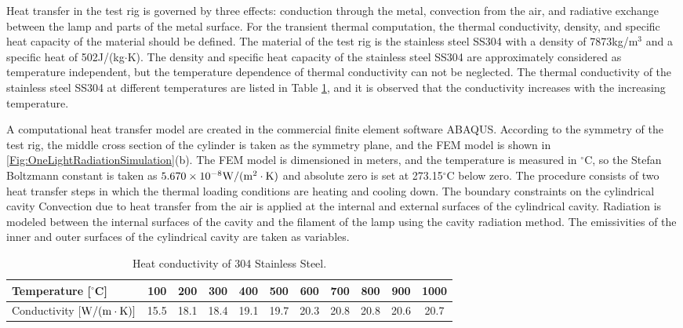 Heat transfer in the test rig is governed by three effects: conduction through the metal, convection from the air, and radiative exchange between the lamp and parts of the metal surface. 
For the transient thermal computation, the thermal conductivity, density, and specific heat capacity of the material should be defined.
The material of the test rig is the stainless steel SS304 with a density of 7873kg/m$^3$ and a specific heat of 502J/(kg$\cdot$K). The density and specific heat capacity of the stainless steel SS304 are approximately considered as temperature independent, but the temperature dependence of thermal conductivity can not be neglected. The thermal conductivity of the stainless steel SS304 at different temperatures are listed in Table \ref{Tab:SS304HeatTransfer}, and it is observed that the conductivity increases with the increasing temperature. 

A computational heat transfer model are created in the commercial finite element software ABAQUS.
According to the symmetry of the test rig, the middle cross section of the cylinder is taken as the symmetry plane, and the FEM model is shown in \ref{Fig:OneLightRadiationSimulation}(b).
The FEM model is dimensioned in meters, and the temperature is measured in $^\circ$C, so the Stefan Boltzmann constant is taken as $5.670\times10^{-8}\rm{W}/(\rm{m}^{2}\cdot\rm{K})$ and absolute zero is set at 273.15$^\circ$C below zero.
The procedure consists of two heat transfer steps in which the thermal loading conditions are heating and cooling down.
The boundary constraints on the cylindrical cavity
Convection due to heat transfer from the air is applied at the internal and external surfaces of the cylindrical cavity.
Radiation is modeled between the internal surfaces of the cavity and the filament of the lamp using the cavity radiation method.
The emissivities of the inner and outer surfaces of the cylindrical cavity are taken as variables. 


\begin{table}[htbp]
  \centering
  \caption{Heat conductivity of 304 Stainless Steel.}
    \begin{tabular}{lcccccccccc}
    \toprule
    Temperature [$^{\circ}$C] & 100   & 200   & 300   & 400   & 500   & 600   & 700   & 800   & 900   & 1000 \\
    \midrule
    Conductivity [${\rm{W/(m}} \cdot {\rm{K)}}]$ & 15.5  & 18.1  & 18.4  & 19.1  & 19.7  & 20.3  & 20.8  & 20.8  & 20.6  & 20.7 \\
    \bottomrule
    \end{tabular}%
  \label{Tab:SS304HeatTransfer}%
\end{table}%


